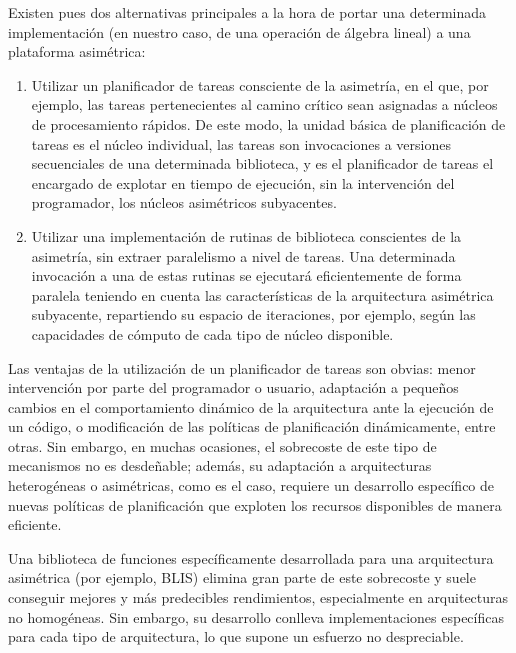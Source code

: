 Existen pues dos alternativas principales a la hora de portar una determinada implementación (en nuestro caso, de una operación
de álgebra lineal) a una plataforma asimétrica:

\begin{enumerate}
 \item Utilizar un planificador de tareas consciente de la asimetría, en el que, por ejemplo, las tareas pertenecientes al camino crítico 
	 sean asignadas a núcleos de procesamiento rápidos. De este modo, la unidad básica de planificación de tareas es el núcleo individual,
		las tareas son invocaciones a versiones secuenciales de una determinada biblioteca, 
		y es el planificador de tareas el encargado de explotar en tiempo de ejecución, sin la intervención del programador, los
		núcleos asimétricos subyacentes.
		
	\item Utilizar una implementación de rutinas de biblioteca conscientes de la asimetría, sin extraer paralelismo a nivel de tareas. Una
		determinada invocación a una de estas rutinas se ejecutará eficientemente de forma paralela teniendo en cuenta las 
		características de la arquitectura asimétrica subyacente, repartiendo su espacio de iteraciones, por ejemplo, según las
		capacidades de cómputo de cada tipo de núcleo disponible.
\end{enumerate}

Las ventajas de la utilización de un planificador de tareas son obvias: menor intervención por parte del programador o usuario,
adaptación a pequeños cambios en el comportamiento dinámico de la arquitectura ante la ejecución de un código, o modificación
de las políticas de planificación dinámicamente, entre otras. Sin embargo, en muchas ocasiones, el sobrecoste de este tipo de
mecanismos no es desdeñable; además, su adaptación a arquitecturas heterogéneas o asimétricas, como es el caso, requiere
un desarrollo específico de nuevas políticas de planificación que exploten los recursos disponibles de manera eficiente.

Una biblioteca de funciones específicamente desarrollada para una arquitectura asimétrica (por ejemplo, BLIS) elimina gran parte
de este sobrecoste y suele conseguir mejores y más predecibles rendimientos, especialmente en arquitecturas no homogéneas. Sin
embargo, su desarrollo conlleva implementaciones específicas para cada tipo de arquitectura, lo que supone un esfuerzo no despreciable.







